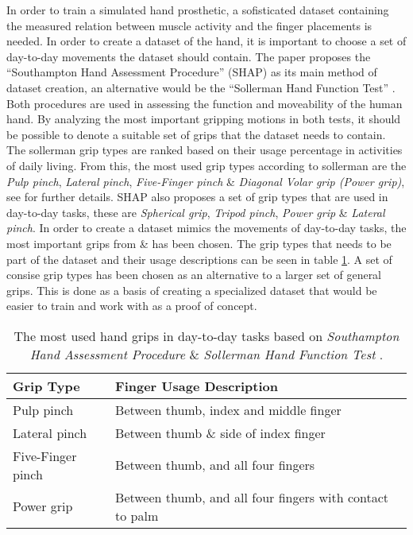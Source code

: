 \documentclass[../main.tex]{subfiles}
\begin{document}
In order to train a simulated hand prosthetic, a sofisticated dataset containing the measured relation between muscle activity and the finger placements is needed.
In order to create a dataset of the hand, it is important to choose a set of day-to-day movements the dataset should contain.
The paper \cite{KeunTaeKim2021} proposes the ``Southampton Hand Assessment Procedure'' (SHAP) \cite{shap} as its main method of dataset creation, an alternative would be the ``Sollerman Hand  Function Test''  \cite{sollerman}.
Both procedures are used in assessing the function and moveability of the human hand.
By analyzing the most important gripping motions in both tests, it should be possible to denote a suitable set of grips that the dataset needs to contain.
The sollerman grip types are ranked based on their usage percentage in activities of daily living.
From this, the most used grip types according to sollerman are the \textit{Pulp pinch}, \textit{Lateral pinch}, \textit{Five-Finger pinch} \& \textit{Diagonal Volar grip (Power grip)}, see \cite{sollerman} for further details.
SHAP also proposes a set of grip types that are used in day-to-day tasks, these are \textit{Spherical grip}, \textit{Tripod pinch}, \textit{Power grip} \& \textit{Lateral pinch}.
In order to create a dataset mimics the movements of day-to-day tasks, the most important grips from \cite{sollerman} \& \cite{shap} has been chosen.
The grip types that needs to be part of the dataset and their usage descriptions can be seen in table \ref{tab:grips}.
A set of consise grip types has been chosen as an alternative to a larger set of general grips.
This is done as a basis of creating a specialized dataset that would be easier to train and work with as a proof of concept.

\begin{table}[h]
\begin{center}
\begin{tabular}{ |l|l| } 
 \hline
 Grip Type & Finger Usage Description \\ 
 \hline
 Pulp pinch & Between thumb, index and middle finger \\ 
 Lateral pinch & Between thumb \& side of index finger \\ 
 Five-Finger pinch & Between thumb, and all four fingers \\ 
 Power grip & Between thumb, and all four fingers with contact to palm \\ 
 \hline
\end{tabular}
\caption{The most used hand grips in day-to-day tasks based on \textit{Southampton Hand Assessment Procedure} \cite{shap} \& \textit{Sollerman Hand Function Test} \cite{sollerman}.}
\label{tab:grips}
\end{center}
\end{table}
\end{document}
